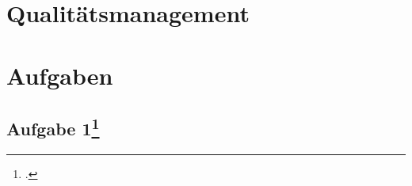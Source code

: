 \documentclass{lehramt-informatik}
\begin{document}

\chapter{Qualitätsmanagement}


\chapter{Aufgaben}

\section{Aufgabe 1\footcite{sosy:ab:9}}
\end{document}
